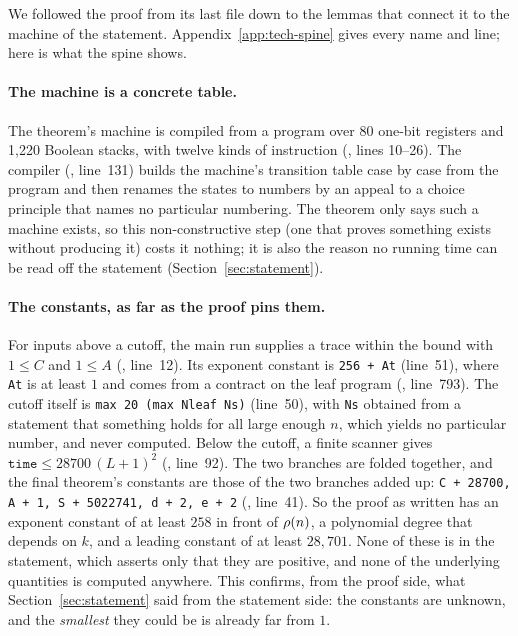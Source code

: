We followed the proof from its last file down to the lemmas that connect
it to the machine of the statement. Appendix~\ref{app:tech-spine} gives
every name and line; here is what the spine shows.

\paragraph{The machine is a concrete table.} The theorem's machine is
compiled from a program over 80 one-bit registers and 1,220 Boolean
stacks, with twelve kinds of instruction
(, lines 10--26). The compiler
(, line~131) builds the
machine's transition table case by case from the program and then renames the states to numbers by an appeal to a choice principle that names no particular numbering. The theorem only says such a machine exists, so this non-constructive step (one that proves something exists without producing it) costs it nothing; it is also the reason no running time can be read off the
statement (Section~\ref{sec:statement}).

\paragraph{The constants, as far as the proof pins them.} For inputs
above a cutoff, the main run supplies a trace within the bound with
$1 \le C$ and $1 \le A$ (,
line~12). Its exponent constant is \texttt{256 + At} (line~51), where
\texttt{At} is at least $1$ and comes from a contract on the leaf
program (, line~793).
The cutoff itself is \texttt{max 20 (max Nleaf Ns)} (line~50), with \texttt{Ns} obtained from a statement that something holds for all large enough $n$, which yields no particular number, and never computed. Below the cutoff, a finite scanner gives
$\mathtt{time} \le 28700\,(L+1)^2$
(, line~92). The two branches are folded together, and the final theorem's constants are those of the two branches added up:
\texttt{C + 28700, A + 1, S + 5022741, d + 2, e + 2}
(, line~41). So the proof as written
has an exponent constant of at least $258$ in front of $\rho(n)$, a
polynomial degree that depends on $k$, and a leading constant of at
least $28{,}701$. None of these is in the statement, which asserts only
that they are positive, and none of the underlying quantities is
computed anywhere. This confirms, from the proof side, what
Section~\ref{sec:statement} said from the statement side: the constants
are unknown, and the \emph{smallest} they could be is already far from
$1$.

